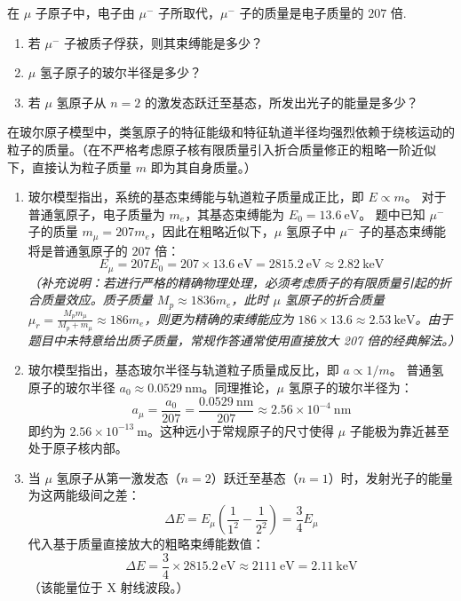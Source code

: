 \begin{exercise}\label{ex:22.14}
在 $\mu$ 子原子中，电子由 $\mu^-$ 子所取代，$\mu^-$ 子的质量是电子质量的 $207$ 倍. 
\begin{enumerate}
  \item[(a)] 若 $\mu^-$ 子被质子俘获，则其束缚能是多少？
  \item[(b)] $\mu$ 氢子原子的玻尔半径是多少？
  \item[(c)] 若 $\mu$ 氢原子从 $n=2$ 的激发态跃迁至基态，所发出光子的能量是多少？
\end{enumerate}
\end{exercise}
\begin{solution}
在玻尔原子模型中，类氢原子的特征能级和特征轨道半径均强烈依赖于绕核运动的粒子的质量。（在不严格考虑原子核有限质量引入折合质量修正的粗略一阶近似下，直接认为粒子质量 $m$ 即为其自身质量。）

\begin{enumerate}
    \item[(a)] 玻尔模型指出，系统的基态束缚能与轨道粒子质量成正比，即 $E \propto m$。
    对于普通氢原子，电子质量为 $m_e$，其基态束缚能为 $E_0 = 13.6 \ \mathrm{eV}$。
    题中已知 $\mu^-$ 子的质量 $m_\mu = 207 m_e$，因此在粗略近似下，$\mu$ 氢原子中 $\mu^-$ 子的基态束缚能将是普通氢原子的 $207$ 倍：
    $$ E_\mu = 207 E_0 = 207 \times 13.6 \ \mathrm{eV} = 2815.2 \ \mathrm{eV} \approx 2.82 \ \mathrm{keV} $$
    \textit{（补充说明：若进行严格的精确物理处理，必须考虑质子的有限质量引起的折合质量效应。质子质量 $M_p \approx 1836 m_e$，此时 $\mu$ 氢原子的折合质量 $\mu_r = \frac{M_p m_\mu}{M_p + m_\mu} \approx 186 m_e$，则更为精确的束缚能应为 $186 \times 13.6 \approx 2.53 \ \mathrm{keV}$。由于题目中未特意给出质子质量，常规作答通常使用直接放大 207 倍的经典解法。）}

    \item[(b)] 玻尔模型指出，基态玻尔半径与轨道粒子质量成反比，即 $a \propto 1/m$。
    普通氢原子的玻尔半径 $a_0 \approx 0.0529 \ \mathrm{nm}$。同理推论，$\mu$ 氢原子的玻尔半径为：
    $$ a_\mu = \frac{a_0}{207} = \frac{0.0529 \ \mathrm{nm}}{207} \approx 2.56 \times 10^{-4} \ \mathrm{nm} $$
    即约为 $2.56 \times 10^{-13} \ \mathrm{m}$。这种远小于常规原子的尺寸使得 $\mu$ 子能极为靠近甚至处于原子核内部。
    
    \item[(c)] 当 $\mu$ 氢原子从第一激发态（$n=2$）跃迁至基态（$n=1$）时，发射光子的能量为这两能级间之差：
    $$ \Delta E = E_\mu \left( \frac{1}{1^2} - \frac{1}{2^2} \right) = \frac{3}{4} E_\mu $$
    代入基于质量直接放大的粗略束缚能数值：
    $$ \Delta E = \frac{3}{4} \times 2815.2 \ \mathrm{eV} \approx 2111 \ \mathrm{eV} = 2.11 \ \mathrm{keV} $$
    （该能量位于 X 射线波段。）
\end{enumerate}
\end{solution}



